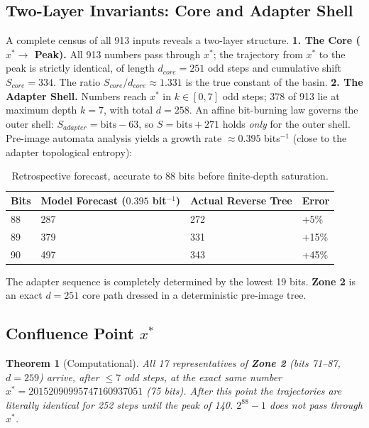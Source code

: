\documentclass[12pt,a4paper]{article}
\newtheorem{theorem}{Theorem}
\theoremstyle{remark}
\begin{document}
\subsection{Two-Layer Invariants: Core and Adapter Shell}
A complete census of all 913 inputs reveals a two-layer structure.
\textbf{1. The Core ($x^* \to$ Peak).} All 913 numbers pass through $x^*$; the trajectory from $x^*$ to the peak is strictly identical, of length $d_{core} = 251$ odd steps and cumulative shift $S_{core} = 334$. The ratio $S_{core}/d_{core} \approx 1.331$ is the true constant of the basin.
\textbf{2. The Adapter Shell.} Numbers reach $x^*$ in $k \in [0,7]$ odd steps; 378 of 913 lie at maximum depth $k=7$, with total $d = 258$. An affine bit-burning law governs the outer shell: $S_{adapter} = \mathrm{bits} - 63$, so $S = \mathrm{bits}+271$ holds \emph{only} for the outer shell. Pre-image automata analysis yields a growth rate $\approx 0.395$ bits$^{-1}$ (close to the adapter topological entropy):
\begin{table}[h]
\centering
\begin{tabular}{llll}
\toprule
\textbf{Bits} & \textbf{Model Forecast ($0.395$ bit$^{-1}$)} & \textbf{Actual Reverse Tree} & \textbf{Error} \\
\midrule
88 & 287 & 272 & +5\% \\
89 & 379 & 331 & +15\% \\
90 & 497 & 343 & +45\% \\
\bottomrule
\end{tabular}
\caption{Retrospective forecast, accurate to 88 bits before finite-depth saturation.}
\end{table}
The adapter sequence is completely determined by the lowest 19 bits. \textbf{Zone 2} is an exact $d=251$ core path dressed in a deterministic pre-image tree.

\subsection{Confluence Point $x^*$}
\begin{theorem}[Computational]
All 17 representatives of \textbf{Zone 2} (bits 71--87, $d=259$) arrive, after $\le7$ odd steps, at the exact same number
$x^* = 20152090995747160937051$ (75 bits). After this point the trajectories are literally identical for 252 steps until the peak of 140. $2^{88}-1$ does not pass through $x^*$.
\end{theorem}
\end{document}
